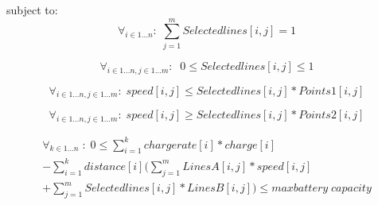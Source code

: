 subject to: 
\begin{equation}
\forall_{i\in1 \dots n }:\; \sum_{j=1}^{m} Selectedlines[i,j] = 1
\end{equation}

\begin{equation}
\forall_{i\in1 \dots n, j \in 1 \dots m}: \; \;0\leq Selectedlines[i,j] \leq 1
\end{equation}

\begin{equation}
\forall_{i\in1 \dots n, j \in 1 \dots m}:\; speed[i,j] \le Selectedlines[i,j] * Points1[i,j]
\end{equation}

\begin{equation}
\forall_{i\in1 \dots n, j \in 1 \dots m}:\; speed[i,j] \ge Selectedlines[i,j] * Points2[i,j]
\end{equation}

\begin{equation}
\begin{split}
\forall_{k\in1 \dots n}\;:\;0 \le\sum_{i=1}^{k}chargerate[i]*charge[i]\\
-\sum_{i=1}^{k} distance[i](\sum_{j=1}^{m} LinesA[i,j]*speed[i,j]\\
+\sum_{j=1}^{m} Selectedlines[i,j]*LinesB[i,j]) \le maxbattery\;capacity
\end{split}
\end{equation}


